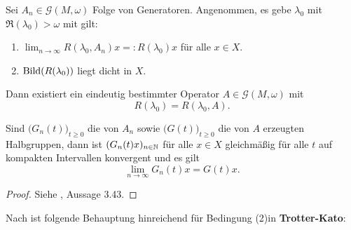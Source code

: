 \begin{fsatz}\label{Trotter-Kato}
Sei $A_n\in \mathcal G(M,\omega)$ Folge von Generatoren. Angenommen, es gebe $\lambda_0$ mit $\mathfrak R(\lambda_0) >\omega$ mit gilt:
\begin{enumerate}
\item $\lim_{n\to\infty}R(\lambda_0, A_n)x =:R(\lambda_0)x$ für alle $x\in X$.
\item $\textnormal{Bild}(R(\lambda_0))$ liegt dicht in $X$.
\end{enumerate}
Dann existiert ein eindeutig bestimmter Operator $A\in\mathcal G(M, \omega)$ mit
\begin{equation*}
R(\lambda_0)=R(\lambda_0, A).
\end{equation*}

\par 
Sind $\big(G_n(t)\big)_{t\geq0}$ die von $A_n$ sowie $\big(G(t)\big)_{t\geq0}$ die von $A$ erzeugten Halbgruppen, dann ist $(G_n(t)x)_{n\in\mathbb{N}}$ für alle $x\in X$ gleichmäßig für alle $t$ auf kompakten Intervallen konvergent und es gilt
\begin{equation*}
\lim_{n\to\infty}G_n(t)x=G(t)x.
\end{equation*}
\end{fsatz}

\begin{proof}
Siehe \cite{banasiak_arlotti_2006}, Aussage  3.43.
\end{proof}



Nach \Cref{} ist folgende Behauptung hinreichend für Bedingung (2)in \textbf{Trotter-Kato}:

